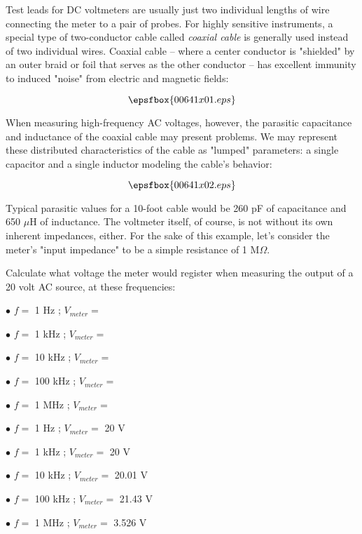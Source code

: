 

Test leads for DC voltmeters are usually just two individual lengths of wire connecting the meter to a pair of probes.  For highly sensitive instruments, a special type of two-conductor cable called {\it coaxial cable} is generally used instead of two individual wires.  Coaxial cable -- where a center conductor is "shielded" by an outer braid or foil that serves as the other conductor -- has excellent immunity to induced "noise" from electric and magnetic fields:

$$\epsfbox{00641x01.eps}$$

When measuring high-frequency AC voltages, however, the parasitic capacitance and inductance of the coaxial cable may present problems.  We may represent these distributed characteristics of the cable as "lumped" parameters: a single capacitor and a single inductor modeling the cable's behavior:

$$\epsfbox{00641x02.eps}$$

Typical parasitic values for a 10-foot cable would be 260 pF of capacitance and 650 $\mu$H of inductance.  The voltmeter itself, of course, is not without its own inherent impedances, either.  For the sake of this example, let's consider the meter's "input impedance" to be a simple resistance of 1 M$\Omega$.

Calculate what voltage the meter would register when measuring the output of a 20 volt AC source, at these frequencies:

\medskip
\item{$\bullet$} $f =$ 1 Hz ; $V_{meter} =$
\item{$\bullet$} $f =$ 1 kHz ; $V_{meter} =$
\item{$\bullet$} $f =$ 10 kHz ; $V_{meter} =$
\item{$\bullet$} $f =$ 100 kHz ; $V_{meter} =$
\item{$\bullet$} $f =$ 1 MHz ; $V_{meter} =$
\medskip







\medskip
\item{$\bullet$} $f =$ 1 Hz ; $V_{meter} =$ 20 V
\item{$\bullet$} $f =$ 1 kHz ; $V_{meter} =$ 20 V
\item{$\bullet$} $f =$ 10 kHz ; $V_{meter} =$ 20.01 V
\item{$\bullet$} $f =$ 100 kHz ; $V_{meter} =$ 21.43 V
\item{$\bullet$} $f =$ 1 MHz ; $V_{meter} =$ 3.526 V
\medskip

